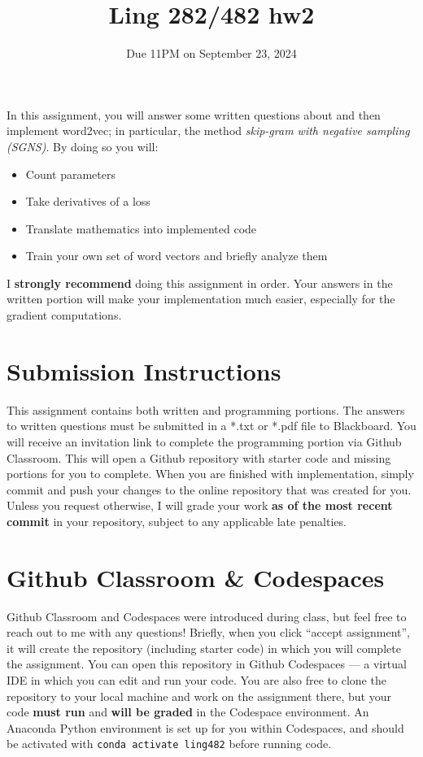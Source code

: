 \documentclass[11pt]{article}
\begin{document}
\title{Ling 282/482 hw2}
\date{\vspace{-0.2in}Due 11PM on September 23, 2024}
\maketitle


In this assignment, you will answer some written questions about and then implement word2vec; in particular, the method \emph{skip-gram with negative sampling (SGNS)}.  By doing so you will:
\begin{itemize}
  \item Count parameters
  \item Take derivatives of a loss
  \item Translate mathematics into implemented code
  \item Train your own set of word vectors and briefly analyze them
\end{itemize}
I \textbf{strongly recommend} doing this assignment in order.  Your answers in the written portion will make your implementation much easier, especially for the gradient computations.

\section*{Submission Instructions}
This assignment contains both written and programming portions. The answers to written questions must be submitted in a *.txt or *.pdf file to Blackboard. You will receive an invitation link to complete the programming portion via Github Classroom. This will open a Github repository with starter code and missing portions for you to complete. When you are finished with implementation, simply commit and push your changes to the online repository that was created for you. Unless you request otherwise, I will grade your work \textbf{as of the most recent commit} in your repository, subject to any applicable late penalties.

\section*{Github Classroom \& Codespaces}
Github Classroom and Codespaces were introduced during class, but feel free to reach out to me with any questions! Briefly, when you click ``accept assignment'', it will create the repository (including starter code) in which you will complete the assignment. You can open this repository in Github Codespaces --- a virtual IDE in which you can edit and run your code. You are also free to clone the repository to your local machine and work on the assignment there, but your code \textbf{must run} and \textbf{will be graded} in the Codespace environment. An Anaconda Python environment is set up for you within Codespaces, and should be activated with \texttt{conda activate ling482} before running code.
\end{document}
